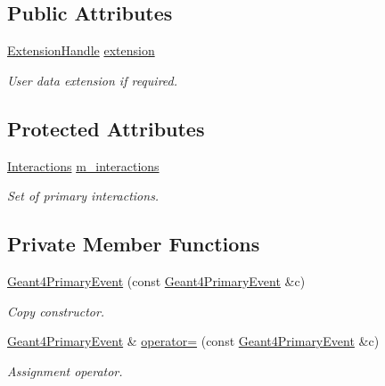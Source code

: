 \subsection*{Public Attributes}
\begin{DoxyCompactItemize}
\item 
\hyperlink{class_d_d4hep_1_1dd4hep__ptr}{ExtensionHandle} \hyperlink{class_d_d4hep_1_1_simulation_1_1_geant4_primary_event_a91db5fc340c2b13402f920b62ba45eb9}{extension}
\begin{DoxyCompactList}\small\item\em User data extension if required. \item\end{DoxyCompactList}\end{DoxyCompactItemize}
\subsection*{Protected Attributes}
\begin{DoxyCompactItemize}
\item 
\hyperlink{class_d_d4hep_1_1_simulation_1_1_geant4_primary_event_adae96b166507159c2dd92b4e20352a52}{Interactions} \hyperlink{class_d_d4hep_1_1_simulation_1_1_geant4_primary_event_accff0a45f858135ce13050e2b1cdb706}{m\_\-interactions}
\begin{DoxyCompactList}\small\item\em Set of primary interactions. \item\end{DoxyCompactList}\end{DoxyCompactItemize}
\subsection*{Private Member Functions}
\begin{DoxyCompactItemize}
\item 
\hyperlink{class_d_d4hep_1_1_simulation_1_1_geant4_primary_event_ae55dce4a449fe6d48475fa3a785d7be4}{Geant4PrimaryEvent} (const \hyperlink{class_d_d4hep_1_1_simulation_1_1_geant4_primary_event}{Geant4PrimaryEvent} \&c)
\begin{DoxyCompactList}\small\item\em Copy constructor. \item\end{DoxyCompactList}\item 
\hyperlink{class_d_d4hep_1_1_simulation_1_1_geant4_primary_event}{Geant4PrimaryEvent} \& \hyperlink{class_d_d4hep_1_1_simulation_1_1_geant4_primary_event_af01ff35982390af71d52773488027179}{operator=} (const \hyperlink{class_d_d4hep_1_1_simulation_1_1_geant4_primary_event}{Geant4PrimaryEvent} \&c)
\begin{DoxyCompactList}\small\item\em Assignment operator. \item\end{DoxyCompactList}\end{DoxyCompactItemize}


